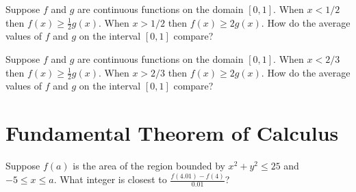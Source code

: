 \documentclass{ximera}
\begin{document}
\begin{problem}
  Suppose $f$ and $g$ are continuous functions on the domain $[0,1]$.  When $x < 1/2$ then $f(x) \geq \frac{1}{2} g(x)$.  When $x > 1/2$ then $f(x) \geq 2 g(x)$.  How do the average values of $f$ and $g$ on the interval $[0,1]$ compare?
  \begin{multipleChoice}
  \end{multipleChoice}
\end{problem}

\begin{problem}
  Suppose $f$ and $g$ are continuous functions on the domain $[0,1]$.  When $x < 2/3$ then $f(x) \geq \frac{1}{2} g(x)$.  When $x > 2/3$ then $f(x) \geq 2 g(x)$.  How do the average values of $f$ and $g$ on the interval $[0,1]$ compare?
  \begin{multipleChoice}
  \end{multipleChoice}
\end{problem}

\clearpage

\section{Fundamental Theorem of Calculus}

\begin{problem}
  Suppose $f(a)$ is the area of the region bounded by $x^2 + y^2 \leq 25$ and $-5 \leq x \leq a$.  What integer is closest to $\frac{f(4.01) - f(4)}{0.01}$?
  \begin{multipleChoice}
  \end{multipleChoice}
\end{problem}
\end{document}

